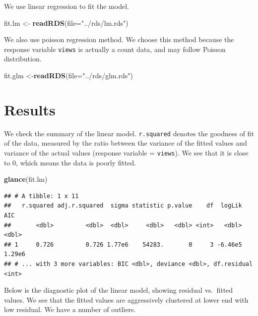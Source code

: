 \documentclass[]{article}
\newenvironment{Shaded}{\begin{snugshade}}{\end{snugshade}}
\newcommand{\DataTypeTok}[1]{\textcolor[rgb]{0.13,0.29,0.53}{#1}}
\newcommand{\KeywordTok}[1]{\textcolor[rgb]{0.13,0.29,0.53}{\textbf{#1}}}
\newcommand{\NormalTok}[1]{#1}
\newcommand{\StringTok}[1]{\textcolor[rgb]{0.31,0.60,0.02}{#1}}
\begin{document}
We use linear regression to fit the model.

\begin{Shaded}
\begin{Highlighting}[]
\NormalTok{fit.lm <-}\StringTok{ }\KeywordTok{readRDS}\NormalTok{(}\DataTypeTok{file=}\StringTok{"../rds/lm.rds"}\NormalTok{)}
\end{Highlighting}
\end{Shaded}

We also use poisson regression method. We choose this method because the
response variable \texttt{views} is actually a count data, and may
follow Poisson distribution.

\begin{Shaded}
\begin{Highlighting}[]
\NormalTok{fit.glm <-}\KeywordTok{readRDS}\NormalTok{(}\DataTypeTok{file=}\StringTok{"../rds/glm.rds"}\NormalTok{)}
\end{Highlighting}
\end{Shaded}

\hypertarget{results}{%
\section{Results}\label{results}}

We check the summary of the linear model. \texttt{r.squared} denotes the
goodness of fit of the data, measured by the ratio between the variance
of the fitted values and variance of the actual values (response
variable = \texttt{views}). We see that it is close to 0, which means
the data is poorly fitted.

\begin{Shaded}
\begin{Highlighting}[]
\KeywordTok{glance}\NormalTok{(fit.lm)}
\end{Highlighting}
\end{Shaded}

\begin{verbatim}
## # A tibble: 1 x 11
##   r.squared adj.r.squared  sigma statistic p.value    df  logLik    AIC
##       <dbl>         <dbl>  <dbl>     <dbl>   <dbl> <int>   <dbl>  <dbl>
## 1     0.726         0.726 1.77e6    54283.       0     3 -6.46e5 1.29e6
## # ... with 3 more variables: BIC <dbl>, deviance <dbl>, df.residual <int>
\end{verbatim}

Below is the diagnostic plot of the linear model, showing residual
vs.~fitted values. We see that the fitted values are aggressively
clustered at lower end with low residual. We have a number of outliers.
\end{document}
